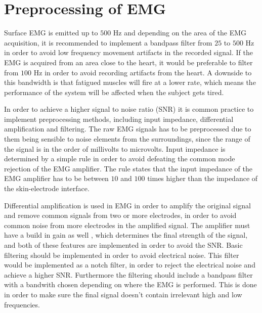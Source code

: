 \section{Preprocessing of EMG}

Surface EMG is emitted up to $500$ Hz and depending on the area of the EMG acquisition, it is recommended to implement a bandpass filter from $25$ to $500$ Hz in order to avoid low frequency movement artifacts in the recorded signal. If the EMG is acquired from an area close to the heart, it would be preferable to filter from $100$ Hz in order to avoid recording artifacts from the heart. A downside to this bandwidth is that fatigued muscles will fire at a lower rate, which means the performance of the system will be affected when the subject gets tired. \cite{cram2012} %

In order to achieve a higher signal to noise ratio (SNR) it is common practice to implement preprocessing methods, including input impedance, differential amplification and filtering. The raw EMG signals has to be preprocessed due to them being sensible to noise elements from the surroundings, since the range of the signal is in the order of millivolts to microvolts. Input impedance is determined by a simple rule in order to avoid defeating the common mode rejection of the EMG amplifier. The rule states that the input impedance of the EMG amplifier has to be between $10$ and $100$ times higher than the impedance of the skin-electrode interface.\cite{cram2012}

Differential amplification is used in EMG in order to amplify the original signal and remove common signals from two or more electrodes, in order to avoid common noise from more electrodes in the amplified signal. The amplifier must have a build in gain as well , which determines the final strength of the signal, and both of these features are implemented in order to avoid the SNR. Basic filtering should be implemented in order to avoid electrical noise. This filter would be implemented as a notch filter, in order to reject the electrical noise and achieve a higher SNR. Furthermore the filtering should include a bandpass filter with a bandwith chosen depending on where the EMG is performed. This is done in order to make sure the final signal doesn't contain irrelevant high and low frequencies.\cite{cram2012}